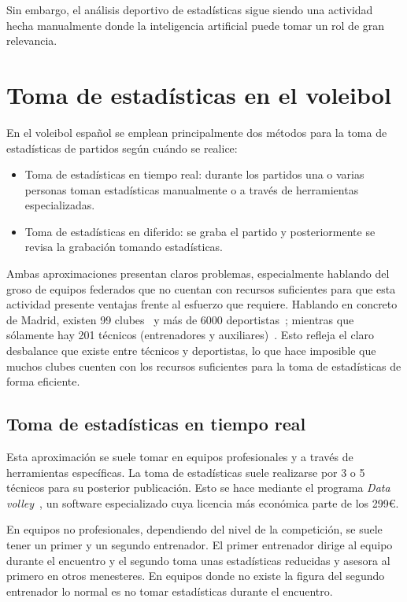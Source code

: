 \documentclass[12pt]{report} %
\begin{document}
    Sin embargo, el análisis deportivo de estadísticas sigue siendo una
    actividad hecha manualmente donde la inteligencia artificial puede tomar un
    rol de gran relevancia.


    \section{Toma de estadísticas en el voleibol}
    En el voleibol español se emplean principalmente dos
    métodos para la toma de estadísticas de partidos según cuándo se realice:
    \begin{itemize}
        \item Toma de estadísticas en tiempo real: durante los partidos una o
        varias personas toman estadísticas manualmente o a través de
        herramientas especializadas.
        \item Toma de estadísticas en diferido: se graba el partido y
        posteriormente se revisa la grabación tomando estadísticas.
    \end{itemize}

    Ambas aproximaciones presentan claros problemas, especialmente hablando del
    groso de equipos federados que no cuentan con recursos suficientes para que
    esta actividad presente ventajas frente al esfuerzo que requiere. Hablando
    en concreto de Madrid, existen 99 clubes~\cite{directorio-clubes} y más de
    6000 deportistas~\cite{estadisticasFEVB}; mientras que sólamente hay
    201 técnicos (entrenadores y auxiliares)~\cite{estadisticasFEVB}. Esto
    refleja el claro desbalance que existe entre técnicos y deportistas, lo que
    hace imposible que muchos clubes cuenten con los recursos suficientes para
    la toma de estadísticas de forma eficiente.

    \subsection{Toma de estadísticas en tiempo real}
    
    Esta aproximación se suele tomar en equipos profesionales y a través de
    herramientas específicas. La toma de estadísticas suele realizarse por 3 o
    5 técnicos para su posterior publicación. Esto se hace mediante el programa
    \textit{Data volley}~\cite{datavoley}, un software especializado cuya
    licencia más económica parte de los 299\euro. 

    En equipos no profesionales, dependiendo del nivel de la competición, se
    suele tener un primer y un segundo entrenador. El primer entrenador dirige
    al equipo durante el encuentro y el segundo toma unas estadísticas
    reducidas y asesora al primero en otros menesteres. En equipos donde no
    existe la figura del segundo entrenador lo normal es no tomar estadísticas
    durante el encuentro.
\end{document}
